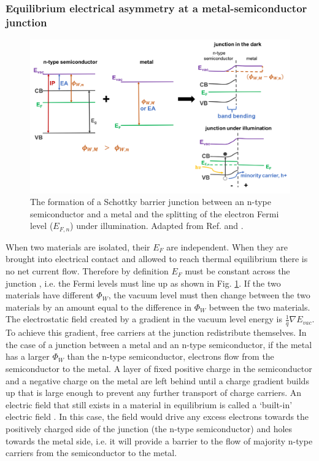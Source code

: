 \documentclass[11pt, twoside]{report}
\begin{document}
\subsubsection{Equilibrium electrical asymmetry at a metal-semiconductor junction}
\begin{figure}[h!]
  \centering
    \includegraphics[width=1.0\textwidth]{figures/schottky_schematic.png}
    \caption{The formation of a Schottky barrier junction between an n-type semiconductor and a metal and the splitting of the electron Fermi level ($E_{F,n}$) under illumination. Adapted from Ref.  and .}
  \label{schottky_schematic}
\end{figure}

When two materials are isolated, their $E_F$ are independent. When they are brought into electrical contact and allowed to reach thermal equilibrium there is no net current flow. Therefore by definition $E_F$ must be constant across the junction \cite{PV_bands_book}, i.e. the Fermi levels must line up as shown in Fig. \ref{schottky_schematic}. 
If the two materials have different $\Phi_W$, the vacuum level must then change between the two materials by an amount equal to the difference in $\Phi_W$ between the two materials. The electrostatic field created by a gradient in the vacuum level energy is $\frac{1}{q} \nabla E_{vac}$.
To achieve this gradient, free carriers at the junction redistribute themselves. In the case of a junction between a metal and an n-type semiconductor, if the metal has a larger $\Phi_W$ than the n-type semiconductor, electrons flow from the semiconductor to the metal. A layer of fixed positive charge in the semiconductor and a negative charge on the metal are left behind until a charge gradient builds up that is large enough to prevent any further transport of charge carriers. An electric field that still exists in a material in equilibrium is called a `built-in' electric field \cite{Nelson5}. In this case, the field would drive any excess electrons towards the positively charged side of the junction (the n-type semiconductor) and holes towards the metal side, i.e. it will provide a barrier to the flow of majority n-type carriers from the semiconductor to the metal.
\end{document}
